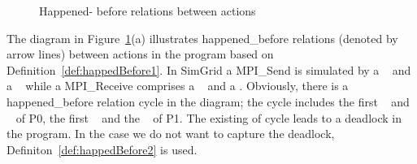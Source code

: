 \documentclass[a4paper,11pt]{article}
\begin{document}
 \begin{figure}[H]
\label{fig:hapend_before}
\hfill
{}
\caption{Happened- before relations between actions}
\end{figure}

The diagram in Figure~\ref{fig:hapend_before}(a) illustrates happened\_before relations (denoted by arrow lines) between actions in the program based on Definition~\ref{def:happedBefore1}. In SimGrid a MPI\_Send is simulated by a \asynsend~ and a \wait~ while a MPI\_Receive comprises a \asynreceive~ and a \wait. Obviously, there is a happened\_before relation cycle in the diagram; the cycle includes the first \wait~ and \asynreceive~ of P0, the first \wait~ and the \asynreceive~ of P1. The existing of cycle leads to a deadlock in the program. In the case we do not want to capture the deadlock, Definiton~\ref{def:happedBefore2} is used.
\end{document}

